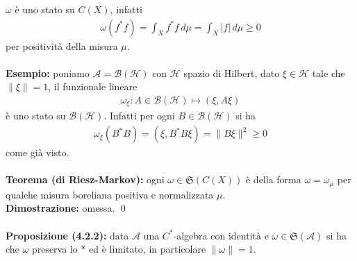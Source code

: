 \documentclass{article}
\numberwithin{equation}{subsection}
\begin{document}
$\omega$ è uno stato su $C(X)$, infatti
\begin{align*}
    \omega(f^*f) = \int_X f^*f \, d\mu = \int_X |f| \, d\mu \geq 0
\end{align*}
per positività della misura $\mu$. \\ \\
\textbf{Esempio:} poniamo $\mathscr{A} = \mathcal{B}(\mathcal{H})$ con $\mathcal{H}$ spazio di Hilbert, dato $\xi \in \mathcal{H}$ tale che $\|\xi\| = 1$, il funzionale lineare
\begin{align*}
    \omega_\xi : A \in \mathcal{B}(\mathcal{H}) \mapsto (\xi, A\xi)
\end{align*}
è uno stato su $\mathcal{B}(\mathcal{H})$. Infatti per ogni $B \in \mathcal{B}(\mathcal{H})$ si ha
\begin{align*}
    \omega_\xi(B^*B) = (\xi, B^*B\xi) = \|B\xi\|^2 \geq 0
\end{align*}
come già visto. \\ \\
\textbf{Teorema (di Riesz-Markov):} ogni $\omega \in \mathfrak{S}(C(X))$ è della forma $\omega = \omega_\mu$ per qualche misura boreliana positiva e normalizzata $\mu$. \\

\textbf{Dimostrazione:} omessa. \qed \\ \\
\textbf{Proposizione (4.2.2):} data $\mathscr{A}$ una $C^*$-algebra con identità e $\omega \in \mathfrak{S}(\mathscr{A})$ si ha che $\omega$ preserva lo $*$ ed è limitato, in particolare $\|\omega\| = 1$. \\
\end{document}
